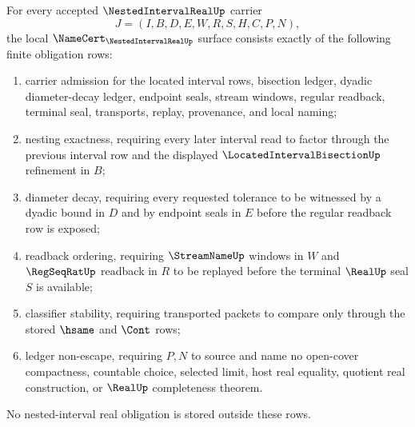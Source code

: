 \begin{theorem}
\label{thm:nested-interval-real-namecert-obligations}
For every accepted $\NestedIntervalRealUp$ carrier
$$
J=(I,B,D,E,W,R,S,H,C,P,N),
$$
the local $\NameCert_{\NestedIntervalRealUp}$ surface consists exactly of the following finite obligation rows:
\begin{enumerate}
\item carrier admission for the located interval rows, bisection ledger, dyadic diameter-decay ledger, endpoint seals, stream windows, regular readback, terminal seal, transports, replay, provenance, and local naming;
\item nesting exactness, requiring every later interval read to factor through the previous interval row and the displayed $\LocatedIntervalBisectionUp$ refinement in $B$;
\item diameter decay, requiring every requested tolerance to be witnessed by a dyadic bound in $D$ and by endpoint seals in $E$ before the regular readback row is exposed;
\item readback ordering, requiring $\StreamNameUp$ windows in $W$ and $\RegSeqRatUp$ readback in $R$ to be replayed before the terminal $\RealUp$ seal $S$ is available;
\item classifier stability, requiring transported packets to compare only through the stored $\hsame$ and $\Cont$ rows;
\item ledger non-escape, requiring $P,N$ to source and name no open-cover compactness, countable choice, selected limit, host real equality, quotient real construction, or $\RealUp$ completeness theorem.
\end{enumerate}
No nested-interval real obligation is stored outside these rows.
\end{theorem}
